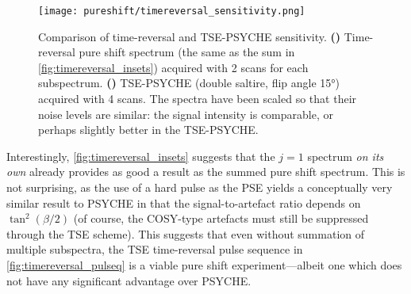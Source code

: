 \begin{figure}[htb]
    \centering
    \texttt{[image: pureshift/timereversal\_sensitivity.png]}%
    {\label{fig:timereversal_sensitivity_tr}}%
    {\label{fig:timereversal_sensitivity_tsepsyche}}%
    \caption[Comparison of time-reversal and TSE-PSYCHE sensitivity]{
        Comparison of time-reversal and TSE-PSYCHE sensitivity.
        \textbf{()} Time-reversal pure shift spectrum (the same as the sum in \cref{fig:timereversal_insets}) acquired with 2 scans for each subspectrum.
        \textbf{()} TSE-PSYCHE (double saltire, flip angle \ang{15}) acquired with 4 scans.
        The spectra have been scaled so that their noise levels are similar: the signal intensity is comparable, or perhaps slightly better in the TSE-PSYCHE.
    }
    \label{fig:timereversal_sensitivity}
\end{figure}

Interestingly, \cref{fig:timereversal_insets} suggests that the $j = 1$ spectrum \textit{on its own} already provides as good a result as the summed pure shift spectrum.
This is not surprising, as the use of a hard pulse as the PSE yields a conceptually very similar result to PSYCHE in that the signal-to-artefact ratio depends on $\tan^2(\beta/2)$ (of course, the COSY-type artefacts must still be suppressed through the TSE scheme).
This suggests that even without summation of multiple subspectra, the TSE time-reversal pulse sequence in \cref{fig:timereversal_pulseq} is a viable pure shift experiment---albeit one which does not have any significant advantage over PSYCHE.
